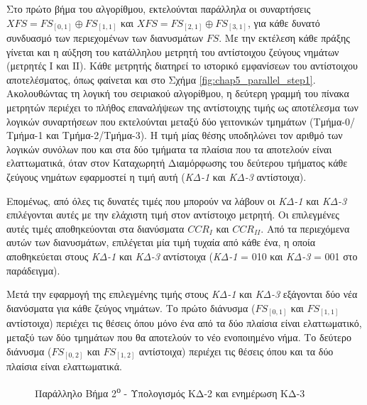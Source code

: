 Στο πρώτο βήμα του αλγορίθμου, εκτελούνται παράλληλα οι συναρτήσεις  $XFS = FS_{[0,1]} \oplus FS_{[1,1]}$  και $XFS = FS_{[2,1]} \oplus FS_{[3,1]}$, για κάθε δυνατό συνδυασμό των περιεχομένων των διανυσμάτων $FS$. Με την εκτέλεση κάθε πράξης γίνεται και η αύξηση του κατάλληλου μετρητή του αντίστοιχου ζεύγους νημάτων (μετρητές Ι και ΙΙ). Κάθε μετρητής διατηρεί το ιστορικό εμφανίσεων του αντίστοιχου αποτελέσματος, όπως φαίνεται και στο Σχήμα \ref{fig:chap5_parallel_step1}. Ακολουθώντας τη λογική του σειριακού αλγορίθμου, η δεύτερη γραμμή του πίνακα μετρητών περιέχει το πλήθος επαναλήψεων της αντίστοιχης τιμής ως αποτέλεσμα των λογικών συναρτήσεων \xor που εκτελούνται μεταξύ δύο γειτονικών τμημάτων (Τμήμα-0/Τμήμα-1 και Τμήμα-2/Τμήμα-3). Η τιμή μίας θέσης υποδηλώνει τον αριθμό των λογικών συνόλων που και στα δύο τμήματα τα πλαίσια που τα αποτελούν είναι ελαττωματικά, όταν στον Καταχωρητή Διαμόρφωσης του δεύτερου τμήματος κάθε ζεύγους νημάτων εφαρμοστεί η τιμή αυτή (\textit{ΚΔ-1} και \textit{ΚΔ-3} αντίστοιχα).
\par
Επομένως, από όλες τις δυνατές τιμές που μπορούν να λάβουν οι \textit{ΚΔ-1} και \textit{ΚΔ-3} επιλέγονται αυτές με την ελάχιστη τιμή στον αντίστοιχο μετρητή. Οι επιλεγμένες αυτές τιμές αποθηκεύονται στα διανύσματα $CCR_{I}$ και $CCR_{II}$. Από τα περιεχόμενα αυτών των διανυσμάτων, επιλέγεται μία τιμή τυχαία από κάθε ένα, η οποία αποθηκεύεται στους \textit{ΚΔ-1} και \textit{ΚΔ-3} αντίστοιχα (\textit{ΚΔ-1} = 010 και \textit{ΚΔ-3} = 001 στο παράδειγμα).
\par
Μετά την εφαρμογή της επιλεγμένης τιμής στους \textit{ΚΔ-1} και \textit{ΚΔ-3} εξάγονται δύο νέα διανύσματα για κάθε ζεύγος νημάτων. Το πρώτο διάνυσμα ($FS_{[0,1]}$ και $FS_{[1,1]}$ αντίστοιχα) περιέχει τις θέσεις όπου μόνο ένα από τα δύο πλαίσια είναι ελαττωματικό, μεταξύ των δύο τμημάτων που θα αποτελούν το νέο ενοποιημένο νήμα. Το δεύτερο διάνυσμα ($FS_{[0,2]}$ και $FS_{[1,2]}$ αντίστοιχα) περιέχει τις θέσεις όπου και τα δύο πλαίσια είναι ελαττωματικά.

\begin{figure}[!t]
    \centering
    \caption{Παράλληλο Βήμα 2\textsuperscript{ο} - Υπολογισμός ΚΔ-2 και ενημέρωση KΔ-3}
    \label{fig:chap5_parallel_step2}
\end{figure}


